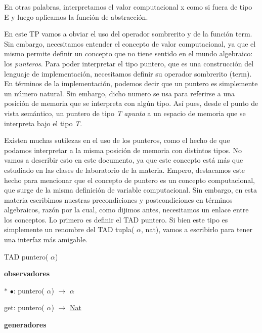 \-En otras palabras, interpretamos el valor computacional x como si fuera de tipo \-E y luego aplicamos la función de abstracción. 

\-En este \-T\-P vamos a obviar el uso del operador sombrerito y de la función term. \-Sin embargo, necesitamos entender el concepto de valor computacional, ya que el mismo permite definir un concepto que no tiene sentido en el mundo algebraico\-: los {\itshape punteros\/}. \-Para poder interpretar el tipo puntero, que es una construcción del lenguaje de implementación, necesitamos definir su operador sombrerito (term). \-En términos de la implementación, podemos decir que un puntero es simplemente un número natural. \-Sin embargo, dicho numero se usa para referirse a una posición de memoria que se interpreta con algún tipo. \-Así pues, desde el punto de vista semántico, un puntero de tipo {\itshape \-T\/} {\itshape apunta\/} a un espacio de memoria que se interpreta bajo el tipo {\itshape \-T\/}.

\-Existen muchas sutilezas en el uso de los punteros, como el hecho de que podamos interpretar a la misma posición de memoria con distintos tipos. \-No vamos a describir esto en este documento, ya que este concepto está más que estudiado en las clases de laboratorio de la materia. \-Empero, destacamos este hecho para mencionar que el concepto de puntero es un concepto computacional, que surge de la misma definición de variable computacional. \-Sin embargo, en esta materia escribimos nuestras precondiciones y postcondiciones en términos algebraicos, razón por la cual, como dijimos antes, necesitamos un enlace entre los conceptos. \-Lo primero es definir el \-T\-A\-D puntero. \-Si bien este tipo es simplemente un renombre del \-T\-A\-D tupla( $\alpha$, nat), vamos a escribirlo para tener una interfaz más amigable.

\-T\-A\-D puntero( $\alpha$)\par
 {\bfseries observadores} \par

\begin{DoxyItemize}
\item $\ast$ $\bullet$\-: puntero( $\alpha$) $\to$ $\alpha$\par

\item get\-: puntero( $\alpha$) $\to$ \hyperlink{classNat}{\-Nat}
\end{DoxyItemize}

{\bfseries generadores} \par


